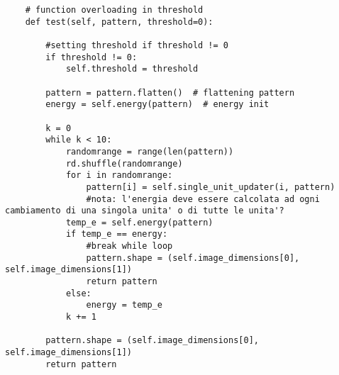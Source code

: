 \documentclass[letterpaper,twocolumn,10pt]{article}
\begin{document}
\begin{lstlisting}
    # function overloading in threshold
    def test(self, pattern, threshold=0):

        #setting threshold if threshold != 0
        if threshold != 0:
            self.threshold = threshold

        pattern = pattern.flatten()  # flattening pattern
        energy = self.energy(pattern)  # energy init

        k = 0
        while k < 10:
            randomrange = range(len(pattern))
            rd.shuffle(randomrange)
            for i in randomrange:
                pattern[i] = self.single_unit_updater(i, pattern)
                #nota: l'energia deve essere calcolata ad ogni cambiamento di una singola unita' o di tutte le unita'?
            temp_e = self.energy(pattern)
            if temp_e == energy:
                #break while loop
                pattern.shape = (self.image_dimensions[0], self.image_dimensions[1])
                return pattern
            else:
                energy = temp_e
            k += 1

        pattern.shape = (self.image_dimensions[0], self.image_dimensions[1])
        return pattern
\end{lstlisting}

\clearpage
\end{document}
